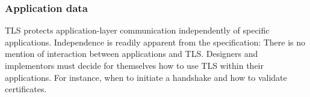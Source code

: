 \subsubsection*{Application data}

TLS protects application-layer communication independently of specific applications.
Independence %
is readily apparent from the specification: There 
is no mention of interaction between applications and TLS. Designers and implementors
must decide for themselves how to use TLS within their applications. For instance,
when to initiate a handshake and how to validate certificates.



